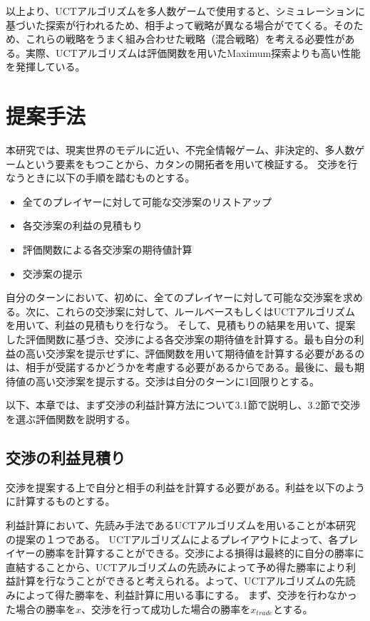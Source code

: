 \documentclass[a4, 10pt,dvipdfmx]{jsarticle}
\begin{document}
以上より、UCTアルゴリズムを多人数ゲームで使用すると、シミュレーションに基づいた探索が行われるため、相手よって戦略が異なる場合がでてくる。そのため、これらの戦略をうまく組み合わせた戦略（混合戦略）を考える必要性がある。実際、UCTアルゴリズムは評価関数を用いたMaximum探索よりも高い性能を発揮している。


\section{提案手法}

本研究では、現実世界のモデルに近い、不完全情報ゲーム、非決定的、多人数ゲームという要素をもつことから、カタンの開拓者を用いて検証する。
交渉を行なうときに以下の手順を踏むものとする。
\begin{itemize}
 \item 全てのプレイヤーに対して可能な交渉案のリストアップ
 \item 各交渉案の利益の見積もり
 \item 評価関数による各交渉案の期待値計算
 \item 交渉案の提示
\end{itemize}
自分のターンにおいて、初めに、全てのプレイヤーに対して可能な交渉案を求める。次に、これらの交渉案に対して、ルールベースもしくはUCTアルゴリズムを用いて、利益の見積もりを行なう。
そして、見積もりの結果を用いて、提案した評価関数に基づき、交渉による各交渉案の期待値を計算する。最も自分の利益の高い交渉案を提示せずに、評価関数を用いて期待値を計算する必要があるのは、相手が受諾するかどうかを考慮する必要があるからである。最後に、最も期待値の高い交渉案を提示する。交渉は自分のターンに1回限りとする。

以下、本章では、まず交渉の利益計算方法について3.1節で説明し、3.2節で交渉を選ぶ評価関数を説明する。

\subsection{交渉の利益見積り}

交渉を提案する上で自分と相手の利益を計算する必要がある。利益を以下のように計算するものとする。

利益計算において、先読み手法であるUCTアルゴリズムを用いることが本研究の提案の１つである。
UCTアルゴリズムによるプレイアウトによって、各プレイヤーの勝率を計算することができる。交渉による損得は最終的に自分の勝率に直結することから、UCTアルゴリズムの先読みによって予め得た勝率により利益計算を行なうことができると考えられる。よって、UCTアルゴリズムの先読みによって得た勝率を、利益計算に用いる事にする。  
まず、交渉を行わなかった場合の勝率を$x$、交渉を行って成功した場合の勝率を$x_{trade}$とする。
\end{document}
